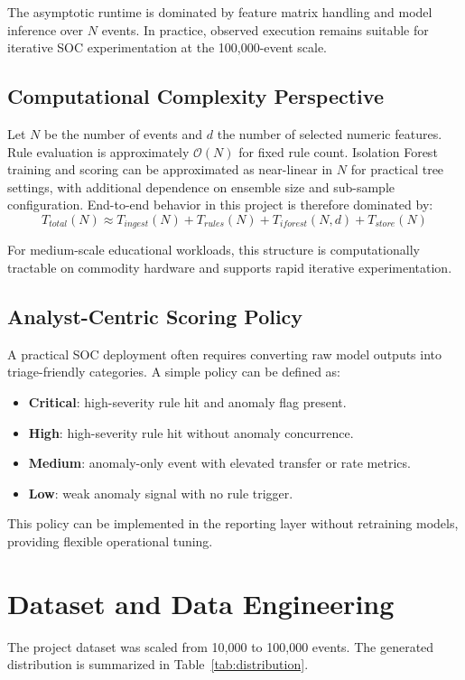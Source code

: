\documentclass[conference]{IEEEtran}
\begin{document}
The asymptotic runtime is dominated by feature matrix handling and model inference over $N$ events. In practice, observed execution remains suitable for iterative SOC experimentation at the 100,000-event scale.

\subsection{Computational Complexity Perspective}
Let $N$ be the number of events and $d$ the number of selected numeric features. Rule evaluation is approximately $\mathcal{O}(N)$ for fixed rule count. Isolation Forest training and scoring can be approximated as near-linear in $N$ for practical tree settings, with additional dependence on ensemble size and sub-sample configuration. End-to-end behavior in this project is therefore dominated by:
\begin{equation}
T_{total}(N) \approx T_{ingest}(N) + T_{rules}(N) + T_{iforest}(N,d) + T_{store}(N)
\end{equation}

For medium-scale educational workloads, this structure is computationally tractable on commodity hardware and supports rapid iterative experimentation.

\subsection{Analyst-Centric Scoring Policy}
A practical SOC deployment often requires converting raw model outputs into triage-friendly categories. A simple policy can be defined as:
\begin{itemize}
    \item \textbf{Critical}: high-severity rule hit and anomaly flag present.
    \item \textbf{High}: high-severity rule hit without anomaly concurrence.
    \item \textbf{Medium}: anomaly-only event with elevated transfer or rate metrics.
    \item \textbf{Low}: weak anomaly signal with no rule trigger.
\end{itemize}

This policy can be implemented in the reporting layer without retraining models, providing flexible operational tuning.

\section{Dataset and Data Engineering}
The project dataset was scaled from 10,000 to 100,000 events.
The generated distribution is summarized in Table~\ref{tab:distribution}.
\end{document}
